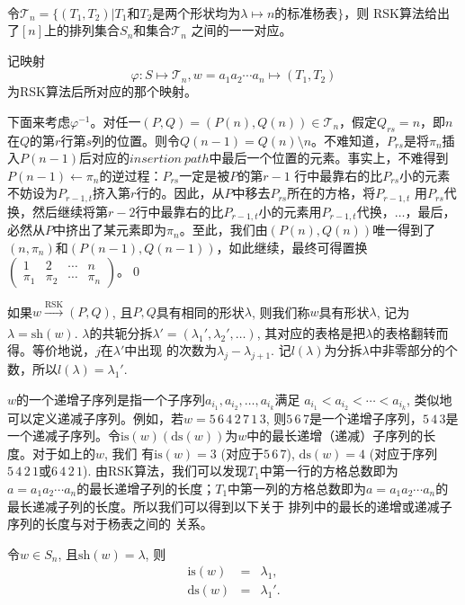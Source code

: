 \\
\\
\\
\\
\\
\\
\\
\\
\\
\\
\\
\begin{thm}
令$\mathcal{T}_{n}=\{(T_{1},
T_{2})|T_{1}$和$T_{2}$是两个形状均为$\lambda\mapsto
n$的标准杨表$\}$，则
RSK算法给出了$[n]$上的排列集合$S_n$和集合$\mathcal{T}_{n}$
之间的一一对应。
\end{thm}
\pf 记映射\[\varphi: S\mapsto \mathcal{T}_{n}, w=a_{1}a_{2}\cdots
a_{n}\mapsto (T_{1}, T_{2})\]为RSK算法后所对应的那个映射。

下面来考虑$\varphi^{-1}$。对任一$(P, Q)=(P(n), Q(n))\in
\mathcal{T}_{n}$，假定$Q_{rs}=n$，即$n$在$Q$的第$r$行第$s$列的位置。则令$Q(n-1)=Q(n)\setminus
n$。不难知道，$P_{rs}$是将$\pi_{n}$插入$P(n-1)$后对应的$insertion\
 path$中最后一个位置的元素。事实上，不难得到$P(n-1)\leftarrow \pi_{n}$的逆过程：$P_{rs}$一定是被$P$的第$r-1$
 行中最靠右的比$P_{rs}$小的元素不妨设为$P_{r-1, t}$挤入第$r$行的。因此，从$P$中移去$P_{rs}$所在的方格，将$P_{r-1, t}$
 用$P_{rs}$代换，然后继续将第$r-2$行中最靠右的比$P_{r-1, t}$小的元素用$P_{r-1, t}$代换，$\ldots$，最后，必然从$P$中挤出了某元素即为$\pi_{n}$。至此，我们由$(P(n), Q(n))$唯一得到了$(n,
\pi_{n})$和$(P(n-1),
Q(n-1))$，如此继续，最终可得置换$\left(\begin{array}{cccc}
1&2&\cdots&n\\\pi_1&\pi_2&\cdots&\pi_n\end{array}\right)$。\qed

如果$w \xrightarrow[]{\text{RSK}}(P,Q)$,
且$P,Q$具有相同的形状$\lambda$, 则我们称$w$具有形状$\lambda$,
记为$\lambda=\mathrm{sh}(w)$.
$\lambda$的共轭分拆$\lambda'=(\lambda_1',\lambda_2',\ldots)$,
其对应的表格是把$\lambda$的表格翻转而得。等价地说，$j$在$\lambda'$中出现
的次数为$\lambda_j-\lambda_{j+1}$.
记$l(\lambda)$为分拆$\lambda$中非零部分的个数，所以$l(\lambda)=\lambda_1'$.

$w$的一个递增子序列是指一个子序列$a_{i_1},a_{i_2},\ldots,a_{i_k}$满足
$a_{i_1}<a_{i_2}<\cdots<a_{i_k}$,
类似地可以定义递减子序列。例如，若$w=5\,6\,4\,2\,7\,1\,3$,
则$5\,6\,7$是一个递增子序列，$5\,4\,3$是一个递减子序列。令$\mathrm{is}(w)
 (\mathrm{ds}(w))$为$w$中的最长递增（递减）子序列的长度。对于如上的$w$, 我们
 有$\mathrm{is}(w) = 3$ (对应于$5\,6\,7$), $\mathrm{ds}(w) =
4$ (对应于序列$5\,4\,2\,1$或$6\,4\,2\,1$).
由RSK算法，我们可以发现$T_{1}$中第一行的方格总数即为$a=a_{1}a_{2}\cdots
a_{n}$的最长递增子列的长度；$T_{1}$中第一列的方格总数即为$a=a_{1}a_{2}\cdots
a_{n}$的最长递减子列的长度。所以我们可以得到以下关于
排列中的最长的递增或递减子序列的长度与对于杨表之间的
关系。
\begin{thm}
令$w \in S_n$, 且$\mathrm{sh}(w)=\lambda$, 则
\begin{eqnarray}
\mathrm{is}(w)&=&\lambda_1,\\
 \mathrm{ds}(w)&=&\lambda_1'.
\end{eqnarray}
\end{thm}


